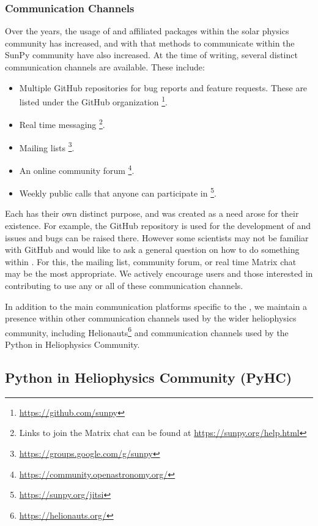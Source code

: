 \subsubsection{Communication Channels}
\label{sssec:communication-channels}

Over the years, the usage of \sunpypkg and affiliated packages within the solar physics community has increased, and with that methods to communicate within the SunPy community have also increased.
At the time of writing, several distinct communication channels are available.
These include:

\begin{itemize}
    \item Multiple GitHub repositories for bug reports and feature requests.
          These are listed under the \sunpyproj GitHub organization \footnote{\url{https://github.com/sunpy}}.
    \item Real time messaging \footnote{Links to join the Matrix chat can be found at \url{https://sunpy.org/help.html}}.
    \item Mailing lists \footnote{\url{https://groups.google.com/g/sunpy}}.
    \item An online community forum \footnote{\url{https://community.openastronomy.org/}}.
    \item Weekly public calls that anyone can participate in \footnote{\url{https://sunpy.org/jitsi}}.
\end{itemize}

Each has their own distinct purpose, and was created as a need arose for their existence.
For example, the GitHub repository is used for the development of \sunpypkg and issues and bugs can be raised there.
However some scientists may not be familiar with GitHub and would like to ask a general question on how to do something within \sunpypkg.
For this, the mailing list, community forum, or real time Matrix chat may be the most appropriate.
We actively encourage users and those interested in contributing to use any or all of these communication channels.

In addition to the main communication platforms specific to the \sunpyproj, we maintain a presence within other communication channels used by the wider heliophysics community, including Helionauts\footnote{\url{https://helionauts.org/}} and communication channels used by the Python in Heliophysics Community.

\subsection{Python in Heliophysics Community (PyHC)}
\label{ssec:python-in-heliophysics-community-pyhc}

